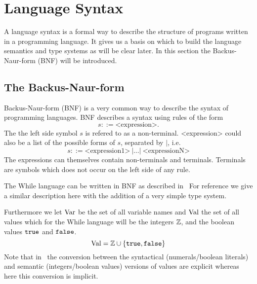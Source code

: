 \section{Language Syntax} \label{sec:language_syntax}

A language syntax is a formal way to describe the structure of programs written
in a programming language. It gives us a basis on which to build the language
semantics and type systems as will be clear later. In this section the
Backus-Naur-form (BNF) will be introduced. 

\subsection{The Backus-Naur-form} \label{sub:the_backus_naur_form} 

Backus-Naur-form (BNF) is a very common way to describe the syntax of
programming languages. BNF describes a syntax using rules of the form
\begin{equation*}
  s ::= \text{<expression>}.
\end{equation*}
The the left side symbol $s$ is refered to as a non-terminal. <expression> could
also be a list of the
possible forms of $s$, separated by $|$, i.e. 
\begin{equation*}
  s ::= \text{<expression1>} \: | \dots | \: \text{<expressionN>}
\end{equation*}
The expressions can themselves contain non-terminals and terminals.
Terminals are symbols which does not occur on the left side of any rule.

The While language can be written in BNF as described
in~\parencite{nielson2007semantics} For reference we give a similar description
here with the addition of a very simple type system.

Furthermore we let $\mbox{$\mathrm{Var}$}$ be the set of all variable names and $\mbox{$\mathrm{Val}$}$ the
set of all values which for the While language will be the integers $\mathbb{Z}$,
and the boolean values $\mbox{\texttt{true}}$ and $\mbox{\texttt{false}}$. 
\begin{equation*}
  \mbox{$\mathrm{Val}$} = \mathbb{Z} \cup \left\{ \mbox{\texttt{true}}, \mbox{\texttt{false}} \right\}
\end{equation*}
Note that in~\parencite{nielson2007semantics} 
the conversion between the syntactical (numerals\slash boolean literals) and semantic
(integers\slash boolean values) versions of values are explicit whereas here 
this conversion is implicit.

